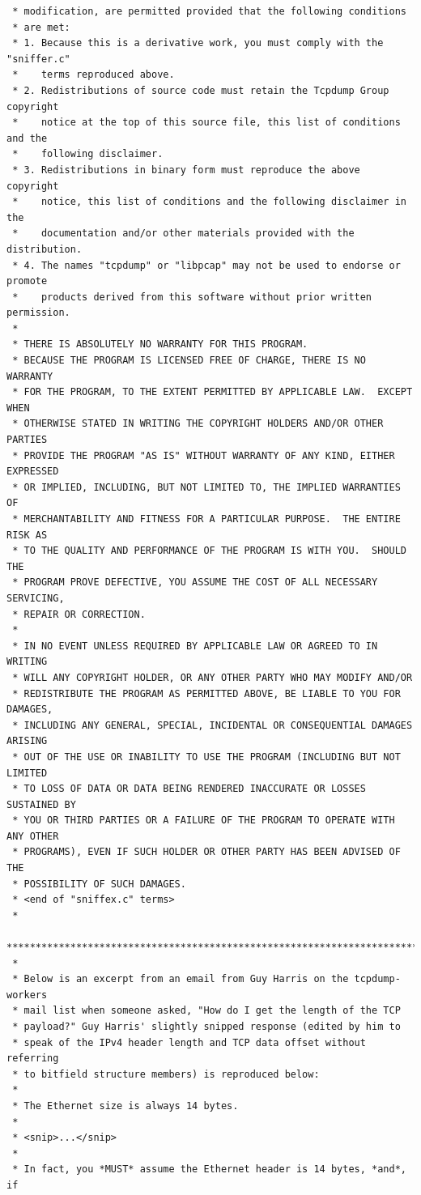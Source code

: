 \documentclass[12pt,english,oneside]{book}
\begin{document}
\begin{lstlisting}
 * modification, are permitted provided that the following conditions
 * are met:
 * 1. Because this is a derivative work, you must comply with the "sniffer.c"
 *    terms reproduced above.
 * 2. Redistributions of source code must retain the Tcpdump Group copyright
 *    notice at the top of this source file, this list of conditions and the
 *    following disclaimer.
 * 3. Redistributions in binary form must reproduce the above copyright
 *    notice, this list of conditions and the following disclaimer in the
 *    documentation and/or other materials provided with the distribution.
 * 4. The names "tcpdump" or "libpcap" may not be used to endorse or promote
 *    products derived from this software without prior written permission.
 *
 * THERE IS ABSOLUTELY NO WARRANTY FOR THIS PROGRAM.
 * BECAUSE THE PROGRAM IS LICENSED FREE OF CHARGE, THERE IS NO WARRANTY
 * FOR THE PROGRAM, TO THE EXTENT PERMITTED BY APPLICABLE LAW.  EXCEPT WHEN
 * OTHERWISE STATED IN WRITING THE COPYRIGHT HOLDERS AND/OR OTHER PARTIES
 * PROVIDE THE PROGRAM "AS IS" WITHOUT WARRANTY OF ANY KIND, EITHER EXPRESSED
 * OR IMPLIED, INCLUDING, BUT NOT LIMITED TO, THE IMPLIED WARRANTIES OF
 * MERCHANTABILITY AND FITNESS FOR A PARTICULAR PURPOSE.  THE ENTIRE RISK AS
 * TO THE QUALITY AND PERFORMANCE OF THE PROGRAM IS WITH YOU.  SHOULD THE
 * PROGRAM PROVE DEFECTIVE, YOU ASSUME THE COST OF ALL NECESSARY SERVICING,
 * REPAIR OR CORRECTION.
 * 
 * IN NO EVENT UNLESS REQUIRED BY APPLICABLE LAW OR AGREED TO IN WRITING
 * WILL ANY COPYRIGHT HOLDER, OR ANY OTHER PARTY WHO MAY MODIFY AND/OR
 * REDISTRIBUTE THE PROGRAM AS PERMITTED ABOVE, BE LIABLE TO YOU FOR DAMAGES,
 * INCLUDING ANY GENERAL, SPECIAL, INCIDENTAL OR CONSEQUENTIAL DAMAGES ARISING
 * OUT OF THE USE OR INABILITY TO USE THE PROGRAM (INCLUDING BUT NOT LIMITED
 * TO LOSS OF DATA OR DATA BEING RENDERED INACCURATE OR LOSSES SUSTAINED BY
 * YOU OR THIRD PARTIES OR A FAILURE OF THE PROGRAM TO OPERATE WITH ANY OTHER
 * PROGRAMS), EVEN IF SUCH HOLDER OR OTHER PARTY HAS BEEN ADVISED OF THE
 * POSSIBILITY OF SUCH DAMAGES.
 * <end of "sniffex.c" terms>
 * 
 ****************************************************************************
 *
 * Below is an excerpt from an email from Guy Harris on the tcpdump-workers
 * mail list when someone asked, "How do I get the length of the TCP
 * payload?" Guy Harris' slightly snipped response (edited by him to
 * speak of the IPv4 header length and TCP data offset without referring
 * to bitfield structure members) is reproduced below:
 * 
 * The Ethernet size is always 14 bytes.
 * 
 * <snip>...</snip>
 *
 * In fact, you *MUST* assume the Ethernet header is 14 bytes, *and*, if 

\end{lstlisting}
\end{document}
